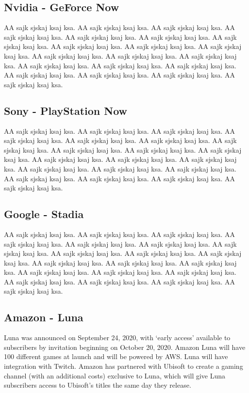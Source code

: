 \subsection{Nvidia - GeForce Now}
AA sajk sjskaj ksaj ksa. AA sajk sjskaj ksaj ksa. AA sajk sjskaj ksaj ksa. AA sajk sjskaj ksaj ksa. AA sajk sjskaj ksaj ksa. AA sajk sjskaj ksaj ksa. AA sajk sjskaj ksaj ksa. AA sajk sjskaj ksaj ksa. AA sajk sjskaj ksaj ksa. AA sajk sjskaj ksaj ksa. AA sajk sjskaj ksaj ksa. AA sajk sjskaj ksaj ksa. AA sajk sjskaj ksaj ksa. AA sajk sjskaj ksaj ksa. AA sajk sjskaj ksaj ksa. AA sajk sjskaj ksaj ksa. AA sajk sjskaj ksaj ksa. AA sajk sjskaj ksaj ksa. AA sajk sjskaj ksaj ksa. AA sajk sjskaj ksaj ksa\cite{GeForce_Now}.
\subsection{Sony - PlayStation Now}
AA sajk sjskaj ksaj ksa. AA sajk sjskaj ksaj ksa. AA sajk sjskaj ksaj ksa. AA sajk sjskaj ksaj ksa. AA sajk sjskaj ksaj ksa. AA sajk sjskaj ksaj ksa. AA sajk sjskaj ksaj ksa. AA sajk sjskaj ksaj ksa. AA sajk sjskaj ksaj ksa. AA sajk sjskaj ksaj ksa. AA sajk sjskaj ksaj ksa. AA sajk sjskaj ksaj ksa. AA sajk sjskaj ksaj ksa. AA sajk sjskaj ksaj ksa. AA sajk sjskaj ksaj ksa. AA sajk sjskaj ksaj ksa. AA sajk sjskaj ksaj ksa. AA sajk sjskaj ksaj ksa. AA sajk sjskaj ksaj ksa. AA sajk sjskaj ksaj ksa\cite{PlayStation_Now}.
\subsection{Google - Stadia}
AA sajk sjskaj ksaj ksa. AA sajk sjskaj ksaj ksa. AA sajk sjskaj ksaj ksa. AA sajk sjskaj ksaj ksa. AA sajk sjskaj ksaj ksa. AA sajk sjskaj ksaj ksa. AA sajk sjskaj ksaj ksa. AA sajk sjskaj ksaj ksa. AA sajk sjskaj ksaj ksa. AA sajk sjskaj ksaj ksa. AA sajk sjskaj ksaj ksa. AA sajk sjskaj ksaj ksa. AA sajk sjskaj ksaj ksa. AA sajk sjskaj ksaj ksa. AA sajk sjskaj ksaj ksa. AA sajk sjskaj ksaj ksa. AA sajk sjskaj ksaj ksa. AA sajk sjskaj ksaj ksa. AA sajk sjskaj ksaj ksa. AA sajk sjskaj ksaj ksa\cite{Google_Stadia}.
\subsection{Amazon - Luna}
Luna was announced on September 24, 2020, with ‘early access’ available to subscribers by invitation beginning on October 20, 2020. Amazon Luna will have 100 different games at launch and will be powered by AWS. Luna will have integration with Twitch. Amazon has partnered with Ubisoft to create a gaming channel (with an additional costs) exclusive to Luna, which will give Luna subscribers access to Ubisoft's titles the same day they release\cite{Amazon_Luna}.